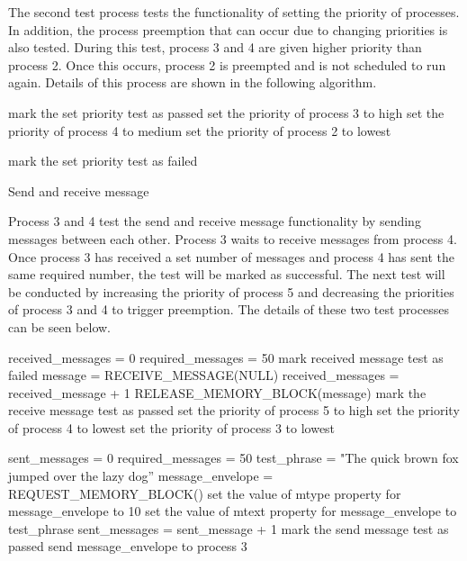 \documentclass[12pt]{report}
\begin{document}
\noindent The second test process tests the functionality of setting the priority of processes. In addition, the process preemption that can occur due to changing priorities is also tested. During this test, process 3 and 4 are given higher priority than process 2. Once this occurs, process 2 is preempted and is not scheduled to run again. Details of this process are shown in the following algorithm.
\begin{algorithmic}
  \State mark the set priority test as passed
  \State set the priority of process 3 to high
  \State set the priority of process 4 to medium
  \State set the priority of process 2 to lowest

  \State mark the set priority test as failed
  \EndWhile
\EndFunction
\end{algorithmic}

Send and receive message

\noindent Process 3 and 4 test the send and receive message functionality by sending messages between each other. Process 3 waits to receive messages from process 4. Once process 3 has received a set number of messages and process 4 has sent the same required number, the test will be marked as successful. The next test will be conducted by increasing the priority of process 5 and decreasing the priorities of process 3 and 4 to trigger preemption. The details of these two test processes can be seen below.
\begin{algorithmic}
  \State received\_messages = 0
  \State required\_messages = 50
    \State mark received message test as failed
    \State message = RECEIVE\_MESSAGE(NULL)
    \State received\_messages = received\_message + 1
    \State RELEASE\_MEMORY\_BLOCK(message)
      \State mark the receive message test as passed
          \State set the priority of process 5 to high
          \State set the priority of process 4 to lowest
          \State set the priority of process 3 to lowest
    \EndIf
  \EndWhile
\EndFunction

  \State sent\_messages = 0
  \State required\_messages = 50
  \State test\_phrase = "The quick brown fox jumped over the lazy dog”
    \State message\_envelope = REQUEST\_MEMORY\_BLOCK()
    \State set the value of mtype property for message\_envelope to 10
    \State set the value of mtext property for message\_envelope to test\_phrase
    \State sent\_messages = sent\_message + 1
      \State mark the send message test as passed
    \Else
      \State send message\_envelope to process 3
    \EndIf
  \EndWhile
\EndFunction
\end{algorithmic}
\end{document}
